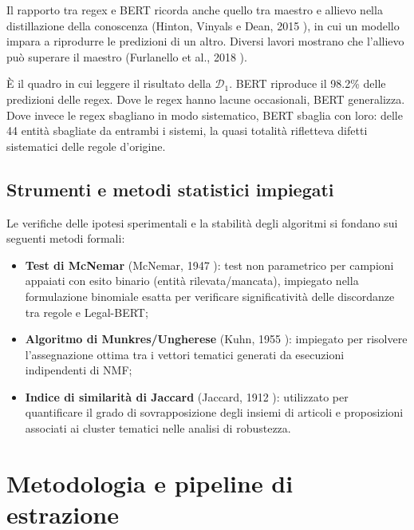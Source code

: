 \documentclass[12pt,a4paper,oneside]{report}
\begin{document}
Il rapporto tra regex e BERT ricorda anche quello tra maestro e allievo nella distillazione della conoscenza (Hinton, Vinyals e Dean, 2015 \cite{hinton2015distilling}), in cui un modello impara a riprodurre le predizioni di un altro. 
Diversi lavori mostrano che l'allievo può superare il maestro (Furlanello et al., 2018 \cite{furlanello2018bornagain}).


È il quadro in cui leggere il risultato della $\mathcal{D}_1$. BERT riproduce il 98.2\% delle predizioni delle regex. Dove le regex hanno lacune occasionali, BERT generalizza. Dove invece le regex sbagliano in modo sistematico, BERT sbaglia con loro: delle 44 entità sbagliate da entrambi i sistemi, la quasi totalità rifletteva difetti sistematici delle regole d'origine.


\section{Strumenti e metodi statistici impiegati}
Le verifiche delle ipotesi sperimentali e la stabilità degli algoritmi si fondano sui seguenti metodi formali:
\begin{itemize}  
    \item \textbf{Test di McNemar} (McNemar, 1947 \cite{mcnemar1947note}): test non parametrico per campioni appaiati con esito binario (entità rilevata/mancata), impiegato nella formulazione binomiale esatta per verificare significatività delle discordanze tra regole e Legal-BERT;
    \item \textbf{Algoritmo di Munkres/Ungherese} (Kuhn, 1955 \cite{kuhn1955hungarian}): impiegato per risolvere l'assegnazione ottima tra i vettori tematici generati da esecuzioni indipendenti di NMF;
    \item \textbf{Indice di similarità di Jaccard} (Jaccard, 1912 \cite{jaccard1912distribution}): utilizzato per quantificare il grado di sovrapposizione degli insiemi di articoli e proposizioni associati ai cluster tematici nelle analisi di robustezza.
\end{itemize}

\clearpage




\chapter{Metodologia e pipeline di estrazione}
\label{cap:metodologia}
\end{document}
